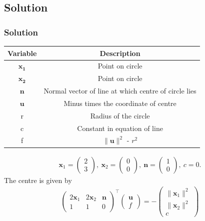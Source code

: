 \documentclass{beamer}
\theoremstyle{remark}
\providecommand{\norm}[1]{\lVert#1\rVert}
\newcommand{\myvec}[1]{\ensuremath{\begin{pmatrix}#1\end{pmatrix}}}
\let\vec\mathbf
\numberwithin{equation}{section}
\begin{document}
\subsection{Solution}
\begin{frame}
\frametitle{Solution}

\begin{center}
\begin{table}
  \begin{tabular}[12pt]{ |c| c|}
    \hline
    \textbf{Variable} & \textbf{Description} \\ 
    \hline
    $\vec{x_1}$ & Point on circle \\
    \hline
    $\vec{x_2}$ & Point on circle \\
    \hline 
    $\vec{n}$ &  Normal vector of line at which centre of circle lies \\
    \hline
    $\vec{u}$ & Minus times the coordinate of centre\\
    \hline
    r & Radius of the circle\\
    \hline
    c & Constant in equation of line\\
    \hline
    f & $\norm{\vec{u}}^2$ - $r^2$ \\ 
    \hline   
    \end{tabular}
\end{table}
\end{center}

\begin{align}
	\vec{x}_{1} = \myvec{2\\3},\ \vec{x}_{2} = \myvec{0\\0},\
	\vec{n} = \myvec{1 \\ 0},\  c= 0.
\end{align}
%
The centre is given by
%
\begin{align}
\myvec{
 2 \vec{x}_1 & 2 \vec{x}_2 & \vec{n}
 \\
 1 & 1 & 0
 }^\top 
	\myvec{\vec{u} \\ f} =
-\myvec{ 	\norm{\vec{x}_1}^2 
\\ \norm{\vec{x}_2}^2 	\\c  }
\end{align}
\end{frame}
\end{document}
